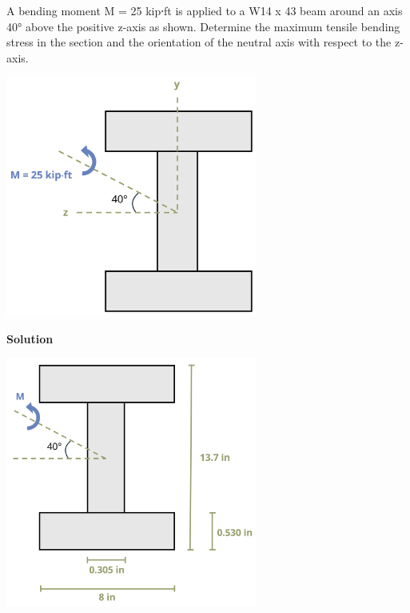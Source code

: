 \documentclass[
  letterpaper,
  DIV=11,
  numbers=noendperiod]{scrreprt}
\begin{document}
\begin{tcolorbox}[enhanced jigsaw, colbacktitle=quarto-callout-note-color!10!white, title={Example 9.6: Unsymmetric Bending\,}, coltitle=black, leftrule=.75mm, rightrule=.15mm, opacityback=0, breakable, colframe=quarto-callout-note-color-frame, left=2mm, arc=.35mm, colback=white, bottomrule=.15mm, bottomtitle=1mm, toptitle=1mm, titlerule=0mm, opacitybacktitle=0.6, toprule=.15mm]

A bending moment M = 25 kip⸱ft is applied to a W14 x 43 beam around an
axis 40° above the positive z-axis as shown. Determine the maximum
tensile bending stress in the section and the orientation of the neutral
axis with respect to the z-axis.

\begin{center}
\includegraphics[width=3.26042in,height=\textheight]{images/CH9 PNGs/Example 9.6 part 1.png}
\end{center}

\textbf{Solution}

\begin{center}
\includegraphics[width=3.26042in,height=\textheight]{images/CH9 PNGs/Example 9.6 part 2.png}
\end{center}


\end{tcolorbox}
\end{document}
